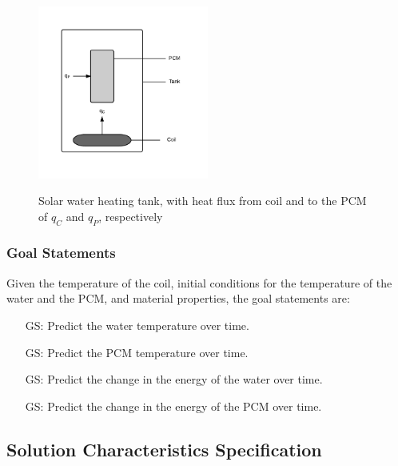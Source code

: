 \documentclass[12pt]{article}
\newcounter{goalnum} %
\begin{document}
\begin{figure}[h!]
\begin{center}
{
 \includegraphics[width=0.5\textwidth]{Tank.png}
}
\caption{\label{Fig_Tank} Solar water heating tank, with heat flux from coil 
and to the PCM of $q_C$ and $q_P$, respectively}
\end{center}
\end{figure}

\subsubsection{Goal Statements}

\noindent Given the temperature of the coil, initial conditions for the temperature of 
the water and the PCM, and material properties, the goal statements are:

\begin{itemize}

\item[GS\refstepcounter{goalnum}\thegoalnum \label{G_wtemp}:] Predict the water 
temperature over time.

\item[GS\refstepcounter{goalnum}\thegoalnum \label{G_ptemp}:] Predict the PCM 
temperature over time.
	
\item[GS\refstepcounter{goalnum}\thegoalnum \label{G_wenergy}:] Predict the 
change in the energy of the water over time.

\item[GS\refstepcounter{goalnum}\thegoalnum \label{G_penergy}:] Predict the 
change in the energy of the PCM over time.

\end{itemize}

\subsection{Solution Characteristics Specification}
\end{document}
